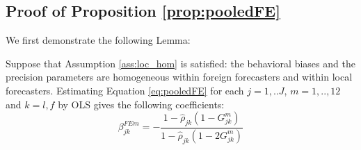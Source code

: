 \subsection{Proof of Proposition \ref{prop:pooledFE}}
\label{proof:pooledFE}

We first demonstrate the following Lemma:
\begin{lemma}\label{lemma:pooledFE} Suppose that Assumption \ref{ass:loc_hom} is satisfied: the behavioral biases and the precision parameters are homogeneous within foreign forecasters and within local forecasters. Estimating Equation \eqref{eq:pooledFE} for each $j=1,..J$, $m=1,..,12$ and $k=l,f$ by OLS gives the following coefficients:
$$\beta^{FEm}_{jk}=-\frac{1-\hat\rho_{jk}(1-G_{jk}^m)}{1-\hat\rho_{jk}(1-2G_{jk}^m)}$$
\end{lemma}

